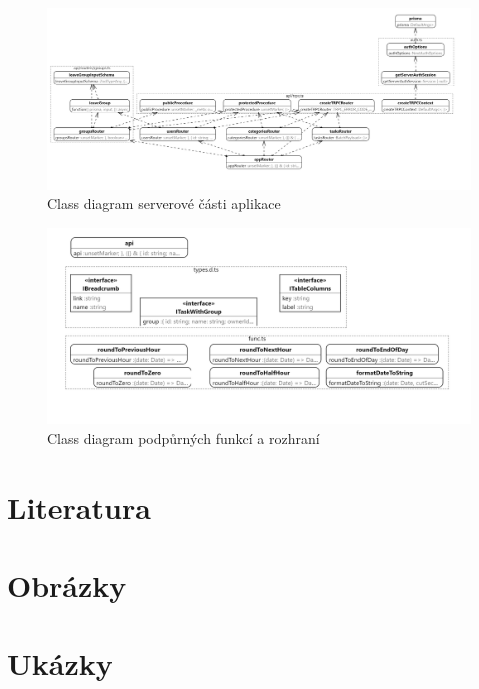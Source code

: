 \documentclass[a4paper,12pt]{report}
\begin{document}
\begin{landscape}
\pagebreak
\begin{figure}[hbt!]
	\centering
	\includegraphics[width=1\linewidth]{img/ClassDiagramy/server_diagram.png}
	\caption{Class diagram serverové části aplikace}
\end{figure}
\begin{figure}[hbt!]
	\centering
	\includegraphics[width=1\linewidth]{img/ClassDiagramy/utils_diagram.png}
	\caption{Class diagram podpůrných funkcí a rozhraní}
\end{figure}

\pagebreak
\end{landscape}
\let\clearpage\relax
\section{Literatura}
\printbibliography[heading=none]
\pagebreak
\section{Obrázky}
\vspace{-64pt}
\listoffigures
\pagebreak
\section{Ukázky}
\vspace{-48pt}
\lstlistoflistings

\pagebreak
\end{document}
